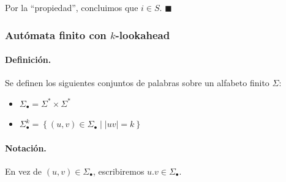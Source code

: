 Por la ``propiedad'', concluimos que $i \in S$. \hfill $\blacksquare$

\subsubsection[Autómata finito con k-lookahead]{Autómata finito con $k$-lookahead}

\paragraph{Definición.} Se definen los siguientes conjuntos de palabras sobre un alfabeto finito $\Sigma$:
\begin{itemize}
    \item $\Sigma_{\bullet}=\Sigma^* \times \Sigma^*$
    \item $\Sigma_{\bullet}^k=\left\{(u, v) \in \Sigma_{\bullet}\mid |uv| = k\right\}$
\end{itemize}

\paragraph{Notación.} En vez de $(u,v) \in \Sigma_\bullet$, escribiremos $u.v \in \Sigma_\bullet$.


